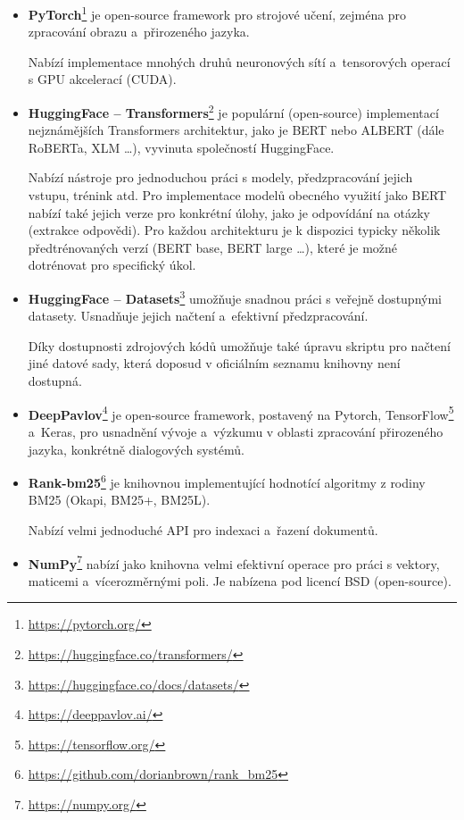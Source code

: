 \begin{itemize}
    \item \textbf{PyTorch}\footnote{\url{https://pytorch.org/}}
    je open-source framework pro strojové učení, zejména pro zpracování obrazu a~přirozeného jazyka. \par
    Nabízí implementace mnohých druhů neuronových sítí a~tensorových operací s GPU akcelerací (CUDA).
    
    \item \textbf{HuggingFace -- Transformers}\footnote{\url{https://huggingface.co/transformers/}}
    je populární (open-source) implementací nejznámějších Transformers architektur, jako je BERT nebo ALBERT (dále RoBERTa, XLM \dots), vyvinuta společností HuggingFace.\par
    Nabízí nástroje pro jednoduchou práci s modely, předzpracování jejich vstupu, trénink atd. Pro implementace modelů obecného využití jako BERT nabízí také jejich verze pro konkrétní úlohy, jako je odpovídání na otázky (extrakce odpovědi). Pro každou architekturu je k dispozici typicky několik předtrénovaných verzí (BERT base, BERT large \dots), které je možné dotrénovat pro specifický úkol.\par
    
    \item \textbf{HuggingFace -- Datasets}\footnote{\url{https://huggingface.co/docs/datasets/}}
    umožňuje snadnou práci s veřejně dostupnými datasety. Usnadňuje jejich načtení a~efektivní předzpracování.\par 
    Díky dostupnosti zdrojových kódů umožňuje také úpravu skriptu pro načtení jiné datové sady, která doposud v oficiálním seznamu knihovny není dostupná.
    
    \item \textbf{DeepPavlov}\footnote{\url{https://deeppavlov.ai/}}
    je open-source framework, postavený na Pytorch, TensorFlow\footnote{\url{https://tensorflow.org/}} a~Keras, pro usnadnění vývoje a~výzkumu v oblasti zpracování přirozeného jazyka, konkrétně dialogových systémů.
    
    \item \textbf{Rank-bm25}\footnote{\url{https://github.com/dorianbrown/rank\_bm25}}
    je knihovnou implementující hodnotící algoritmy z rodiny BM25 \cite{bm25_improvements} (Okapi, BM25+, BM25L).\par
    Nabízí velmi jednoduché API pro indexaci a~řazení dokumentů.
    
    \item \textbf{NumPy}\footnote{\url{https://numpy.org/}}
    nabízí jako knihovna velmi efektivní operace pro práci s vektory, maticemi a~vícerozměrnými poli. Je nabízena pod licencí BSD (open-source).
    

\end{itemize}
